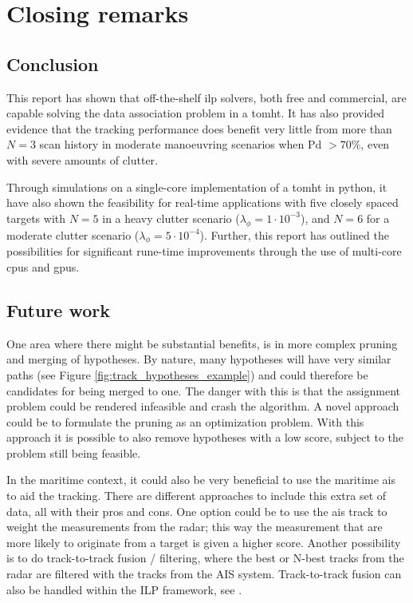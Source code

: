 \section{Closing remarks}
\subsection{Conclusion}
This report has shown that off-the-shelf \gls{ilp} \glspl{solver}, both free and commercial, are capable solving the data association problem in a \gls{tomht}. It has also provided evidence that the \gls{tracking} performance does benefit very little from more than $N=3$ scan history in moderate manoeuvring scenarios when \gls{Pd} $> 70\%$, even with severe amounts of \gls{clutter}.

Through simulations on a single-core implementation of a \gls{tomht} in \gls{python}, it have also shown the feasibility for real-time applications with five closely spaced targets with $N=5$ in a heavy clutter scenario ($\lambda_\phi = 1 \cdot 10^{-3}$), and $N=6$ for a moderate clutter scenario ($\lambda_\phi = 5 \cdot 10 ^{-4}$). Further, this report has  outlined the possibilities for significant rune-time improvements through the use of multi-core \glspl{cpu} and \glspl{gpu}.

\subsection{Future work}
One area where there might be substantial benefits, is in more complex \gls{pruning} and merging of hypotheses. By nature, many hypotheses will have very similar paths (see Figure \ref{fig:track_hypotheses_example}) and could therefore be candidates for being merged to one. The danger with this is that the assignment problem could be rendered infeasible and crash the algorithm. A novel approach could be to formulate the pruning as an optimization problem. With this approach it is possible to also remove hypotheses with a low score, subject to the problem still being feasible.

In the maritime context, it could also be very beneficial to use the maritime \gls{ais} to aid the \gls{tracking}. There are different approaches to include this extra set of data, all with their pros and cons. One option could be to use the \gls{ais} track to weight the measurements from the radar; this way the measurement that are more likely to originate from a target is given a higher score. Another possibility is to do track-to-track fusion / filtering, where the best or N-best tracks from the radar are filtered with the tracks from the AIS system. Track-to-track fusion can also be handled within the ILP framework, see \cite{Coraluppi2000}.

